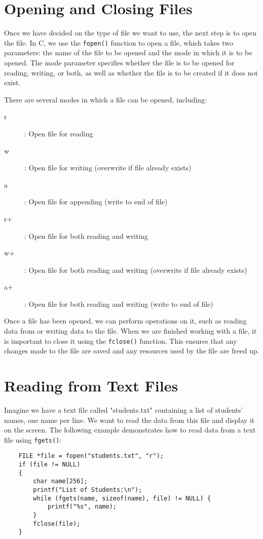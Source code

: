 \section{Opening and Closing Files}
Once we have decided on the type of file we want to use, the next step is to open the
file. In C, we use the {\tt fopen()} function to open a file, which takes two parameters:
the name of the file to be opened and the mode in which it is to be opened. The mode
parameter specifies whether the file is to be opened for reading, writing, or both, as
well as whether the file is to be created if it does not exist.

There are several modes in which a file can be opened, including:
\begin{description}
\item[r]: Open file for reading
\item[w]: Open file for writing (overwrite if file already exists)
\item[a]: Open file for appending (write to end of file)
\item[r$+$]: Open file for both reading and writing
\item[w$+$]: Open file for both reading and writing (overwrite if file already exists)
\item[a$+$]: Open file for both reading and writing (write to end of file)
\end{description}
Once a file has been opened, we can perform operations on it, such as reading data from
or writing data to the file. When we are finished working with a file, it is important to
close it using the {\tt fclose()} function. This ensures that any changes made to the
file are saved and any resources used by the file are freed up.


\section{Reading from Text Files}
Imagine we have a text file called "students.txt" containing a list of students' names, one name per line. We want to read the data from this file and display it on the screen. The following example demonstrates how to read data from a text file using {\tt fgets()}:

\begin{verbatim}
	FILE *file = fopen("students.txt", "r");
	if (file != NULL) 
	{
		char name[256];
		printf("List of Students:\n");
		while (fgets(name, sizeof(name), file) != NULL) {
			printf("%s", name);
		}
		fclose(file);
	}
\end{verbatim}

